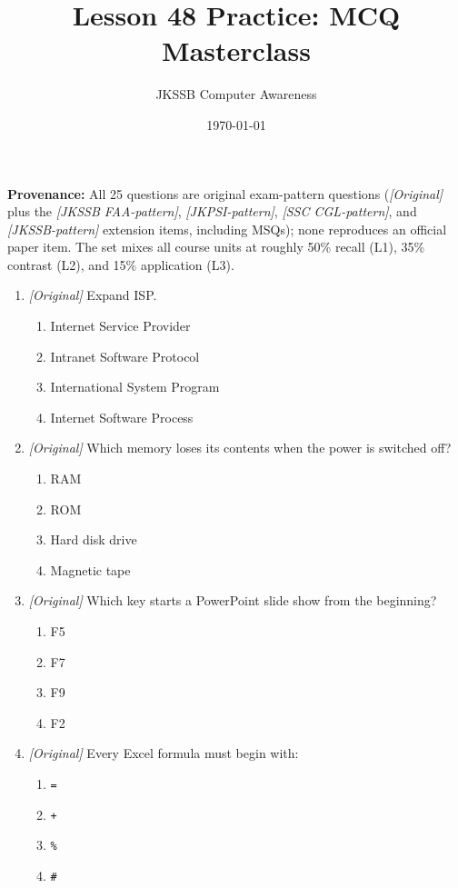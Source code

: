 \documentclass[11pt]{article}
\title{Lesson 48 Practice: MCQ Masterclass}
\author{JKSSB Computer Awareness}
\date{\today}
\begin{document}
\maketitle
\noindent\textbf{Provenance:} All 25 questions are original exam-pattern questions (\textit{[Original]} plus the \textit{[JKSSB FAA-pattern]}, \textit{[JKPSI-pattern]}, \textit{[SSC CGL-pattern]}, and \textit{[JKSSB-pattern]} extension items, including MSQs); none reproduces an official paper item. The
set mixes all course units at roughly 50\% recall (L1), 35\% contrast (L2),
and 15\% application (L3).

\begin{enumerate}[label=\textbf{Q\arabic*.}, leftmargin=*]
\item \textit{[Original]} Expand ISP.
  \begin{enumerate}[label=\Alph*.]
    \item Internet Service Provider
    \item Intranet Software Protocol
    \item International System Program
    \item Internet Software Process
  \end{enumerate}
\item \textit{[Original]} Which memory loses its contents when the power is
  switched off?
  \begin{enumerate}[label=\Alph*.]
    \item RAM
    \item ROM
    \item Hard disk drive
    \item Magnetic tape
  \end{enumerate}
\item \textit{[Original]} Which key starts a PowerPoint slide show from the
  beginning?
  \begin{enumerate}[label=\Alph*.]
    \item F5
    \item F7
    \item F9
    \item F2
  \end{enumerate}
\item \textit{[Original]} Every Excel formula must begin with:
  \begin{enumerate}[label=\Alph*.]
    \item \texttt{=}
    \item \texttt{+}
    \item \texttt{\%}
    \item \texttt{\#}

\end{enumerate}
\end{enumerate}
\end{document}
